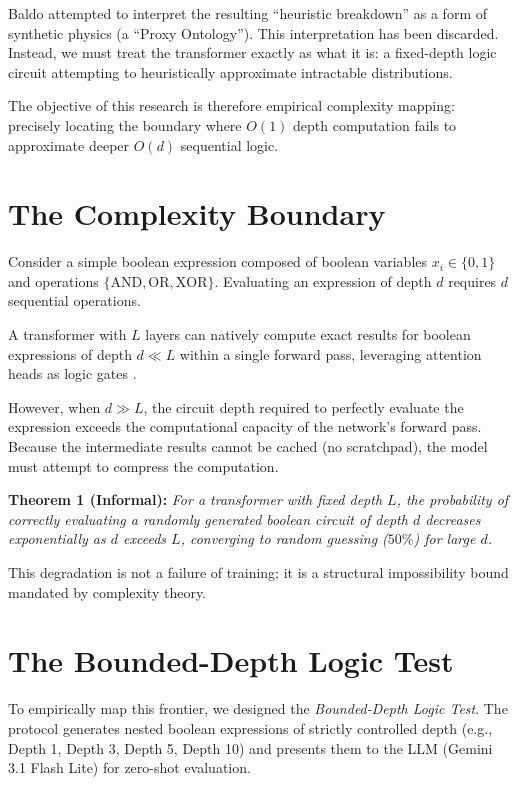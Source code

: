 \documentclass[12pt,a4paper]{article}
\begin{document}
Baldo \citep{baldo2026_residue} attempted to interpret the resulting ``heuristic breakdown'' as a form of synthetic physics (a ``Proxy Ontology''). This interpretation has been discarded. Instead, we must treat the transformer exactly as what it is: a fixed-depth logic circuit attempting to heuristically approximate intractable distributions.

The objective of this research is therefore empirical complexity mapping: precisely locating the boundary where $O(1)$ depth computation fails to approximate deeper $O(d)$ sequential logic.

\section{The Complexity Boundary}

Consider a simple boolean expression composed of boolean variables $x_i \in \{0, 1\}$ and operations $\{\text{AND}, \text{OR}, \text{XOR}\}$. Evaluating an expression of depth $d$ requires $d$ sequential operations.

A transformer with $L$ layers can natively compute exact results for boolean expressions of depth $d \ll L$ within a single forward pass, leveraging attention heads as logic gates \citep{merrill2023_parallelism}.

However, when $d \gg L$, the circuit depth required to perfectly evaluate the expression exceeds the computational capacity of the network's forward pass. Because the intermediate results cannot be cached (no scratchpad), the model must attempt to compress the computation.

\textbf{Theorem 1 (Informal):} \textit{For a transformer with fixed depth $L$, the probability of correctly evaluating a randomly generated boolean circuit of depth $d$ decreases exponentially as $d$ exceeds $L$, converging to random guessing ($50\%$) for large $d$.}

This degradation is not a failure of training; it is a structural impossibility bound mandated by complexity theory.

\section{The Bounded-Depth Logic Test}

To empirically map this frontier, we designed the \emph{Bounded-Depth Logic Test}. The protocol generates nested boolean expressions of strictly controlled depth (e.g., Depth 1, Depth 3, Depth 5, Depth 10) and presents them to the LLM (Gemini 3.1 Flash Lite) for zero-shot evaluation.
\end{document}
